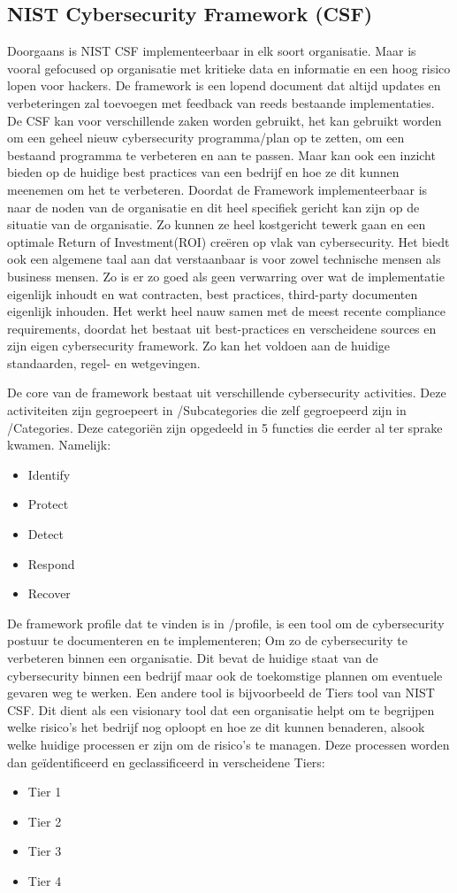 \subsection{NIST Cybersecurity Framework (CSF)}

Doorgaans is NIST CSF implementeerbaar in elk soort organisatie. Maar is vooral gefocused op organisatie met kritieke data en informatie en een hoog risico lopen voor hackers.
De framework is een lopend document dat altijd updates en verbeteringen zal toevoegen met feedback van reeds bestaande implementaties. \autocite{Calder2018}
De CSF kan voor verschillende zaken worden gebruikt, het kan gebruikt worden om een geheel nieuw cybersecurity programma/plan op te zetten, om een bestaand programma te verbeteren en aan te passen. Maar kan ook een inzicht bieden op de huidige best practices van een bedrijf en hoe ze dit kunnen meenemen om het te verbeteren.
Doordat de Framework implementeerbaar is naar de noden van de organisatie en dit heel specifiek gericht kan zijn op de situatie van de organisatie. Zo kunnen ze heel kostgericht tewerk gaan en een optimale Return of Investment(ROI) creëren op vlak van cybersecurity.
Het biedt ook een algemene taal aan dat verstaanbaar is voor zowel technische mensen als business mensen. Zo is er zo goed als geen verwarring over wat de implementatie eigenlijk inhoudt en wat contracten, best practices, third-party documenten eigenlijk inhouden.
Het werkt heel nauw samen met de meest recente compliance requirements, doordat het bestaat uit best-practices en verscheidene sources en zijn eigen cybersecurity framework. Zo kan het voldoen aan de huidige standaarden, regel- en wetgevingen. \autocite{Calder2018}

De core van de framework bestaat uit verschillende cybersecurity activities. Deze activiteiten zijn gegroepeert in /Subcategories die zelf gegroepeerd zijn in /Categories. Deze categoriën zijn opgedeeld in 5 functies die eerder al ter sprake kwamen.
Namelijk:

\begin{itemize}
    \item Identify
    \item Protect
    \item Detect
    \item Respond
    \item Recover
\end{itemize}

De framework profile dat te vinden is in /profile, is een tool om de cybersecurity postuur te documenteren en te implementeren; Om zo de cybersecurity te verbeteren binnen een organisatie.
Dit bevat de huidige staat van de cybersecurity binnen een bedrijf maar ook de toekomstige plannen om eventuele gevaren weg te werken. \autocite{Sultan2017}
Een andere tool is bijvoorbeeld de Tiers tool van NIST CSF. Dit dient als een visionary tool dat een organisatie helpt om te begrijpen welke risico's het bedrijf nog oploopt en hoe ze dit kunnen benaderen, alsook welke huidige processen er zijn om de risico's te managen.
Deze processen worden dan geïdentificeerd en geclassificeerd in verscheidene Tiers: \autocite{Sultan2017}

\begin{itemize}
    \item Tier 1 \Partial
    \item Tier 2 \Riskinformed
    \item Tier 3 \Repeatable
    \item Tier 4 \Adaptive
\end{itemize} 
